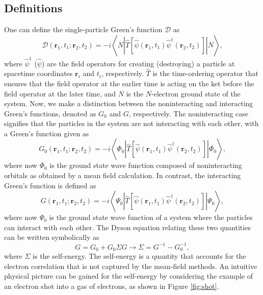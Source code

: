 \documentclass[12pt]{caltech_thesis}
\begin{document}
\subsection{Definitions}
One can define the single-particle Green's function $\mathcal{D}$ as
\begin{equation}
\mathcal{D}\left(\mathbf{r}_1, t_1 ; \mathbf{r}_2, t_2\right)=-i\left\langle N\left|\hat{T}\left[\hat{\psi }\left(\mathbf{r}_1, t_1\right) \hat{\psi }^{\dagger}\left(\mathbf{r}_2, t_2\right)\right]\right|  N\right\rangle,
\end{equation}
where $\hat{\psi }^{\dagger}$ ($\hat{\psi }$) are the field operators for creating (destroying) a particle at spacetime coordinates $\mathbf{r}_{i}$ and $t_{i}$, respectively. $\hat{T}$ is the time-ordering operator that ensures that the field operator at the earlier time is acting on the ket before the field operator at the later time, and $N$ is the $N$-electron ground state of the system. Now, we make a distinction between the noninteracting and interacting Green's functions, denoted as $G_0$ and $G$, respectively. The noninteracting case signifies that the particles in the system are not interacting with each other, with a Green's function given as
\begin{equation}
G_0\left(\mathbf{r}_1, t_1 ; \mathbf{r}_2, t_2\right)=-i\left\langle\Phi_0\left|\hat{T}\left[\hat{\psi }\left(\mathbf{r}_1, t_1\right) \hat{\psi }^{\dagger}\left(\mathbf{r}_2, t_2\right)\right]\right| \Phi_0\right\rangle,
\end{equation}
where now $\Phi_0$ is the ground state wave function composed of noninteracting orbitals as obtained by a mean field calculation. In contrast, the interacting Green's function is defined as
\begin{equation}
G\left(\mathbf{r}_1, t_1 ; \mathbf{r}_2, t_2\right)=-i\left\langle \Psi _0\left|\hat{T}\left[\hat{\psi }\left(\mathbf{r}_1, t_1\right) \hat{\psi }^{\dagger}\left(\mathbf{r}_2, t_2\right)\right]\right|  \Psi _0\right\rangle,
\end{equation}
where now $\Psi_0$ is the ground state wave function of a system where the particles can interact with each other.
 The Dyson equation relating these two quantities can be written symbolically as \autocite{bruneval_assessment_2019}
\begin{equation}
G=G_0+G_0\Sigma G \rightarrow \Sigma = G^{-1}-G_0^{-1},
\label{eqn:dyson}
\end{equation}
where $\Sigma$ is the self-energy. The self-energy is a quantity that accounts for the electron correlation that is not captured by the mean-field methods. An intuitive physical picture can be gained for the self-energy by considering the example of an electron shot into a gas of electrons, as shown in Figure \ref{fig:shot}.
\end{document}
